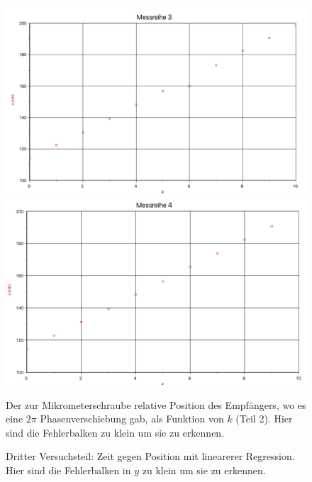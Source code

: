 \documentclass[11pt,a4paper]{article}
\begin{document}
\begin{figure}
	\includegraphics[width=\linewidth]{Anhang3}
	\includegraphics[width=\linewidth]{Anhang4}
	\caption{Der zur Mikrometerschraube relative Position des Empfängers, wo es eine $2\pi$ Phasenverschiebung gab, als Funktion von $k$ (Teil 2). Hier sind die Fehlerbalken zu klein um sie zu erkennen.}
\end{figure}

\begin{figure}[p]
\centering
{}
\renewcommand\thefigure{8}
\caption[Dritter Versuchsteil: Zeit gegen Position mit linearerer Regression]{Dritter Versuchsteil: Zeit gegen Position mit linearerer Regression. Hier sind die Fehlerbalken in $y$ zu klein um sie zu erkennen.}
\label{Abb:8}
\end{figure}
\end{document}

